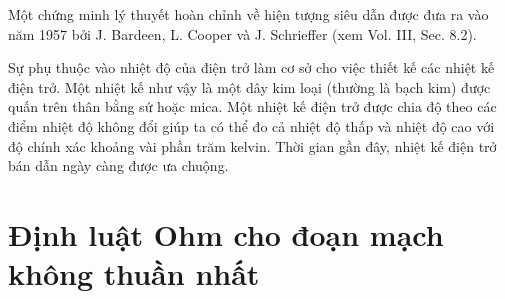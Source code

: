 Một chứng minh lý thuyết hoàn chỉnh về hiện tượng siêu dẫn được đưa ra vào năm 1957 bởi J. Bardeen, L. Cooper và J. Schrieffer (xem Vol. III, Sec. 8.2).

Sự phụ thuộc vào nhiệt độ của điện trở làm cơ sở cho việc thiết kế các nhiệt kế điện trở. Một nhiệt kế như vậy là một dây kim loại (thường là bạch kim) được quấn trên thân bằng sứ hoặc mica. Một nhiệt kế điện trở được chia độ theo các điểm nhiệt độ không đổi giúp ta có thể đo cả nhiệt độ thấp và nhiệt độ cao với độ chính xác khoảng vài phần trăm kelvin. Thời gian gần đây, nhiệt kế điện trở bán dẫn ngày càng được ưa chuộng.

\section{Định luật Ohm cho đoạn mạch không thuần nhất}\label{sec:5_5}

